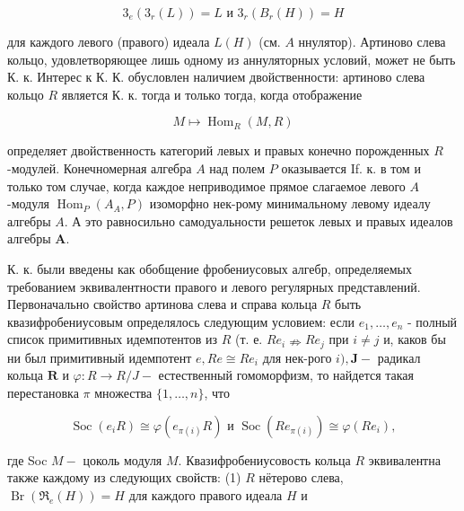 \documentclass[10pt]{article}
\begin{document}
\[

3_{e}\left(3_{r}(L)\right)=L \text { и } 3_{r}\left(B_{r}(H)\right)=H

\]



для каждого левого (правого) идеала $L(H)$ (см. $A$ ннулятор). Артиново слева кольцо, удовлетворяющее лишь одному из аннуляторных условий, может не быть К. к. Интерес к К. К. обусловлен наличием двойственности: артиново слева кольцо $R$ является К. к. тогда и только тогда, когда отображение



\[

M \longmapsto \operatorname{Hom}_{R}(M, R)

\]



определяет двойственность категорий левых и правых конечно порожденных $R$-модулей. Конечномерная алгебра $A$ над полем $P$ оказывается If. к. в том и только том случае, когда каждое неприводимое прямое слагаемое левого $A$-модуля $\operatorname{Hom}_{P}\left(A_{A}, P\right)$ изоморфно нек-рому минимальному левому идеалу алгебры $A$. А это равносильно самодуальности решеток левых и правых идеалов алгебры $\boldsymbol{A}$.



К. к. были введены как обобщение фробениусовых алгебр, определяемых требованием эквивалентности правого и левого регулярных представлений. Первоначально свойство артинова слева и справа кольца $R$ быть квазифробениусовым определялось следующим условием: если $e_{1}, \ldots, e_{n}$ - полный список примитивных идемпотентов из $R$ (т. е. $R e_{i} \nRightarrow R e_{j}$ при $i \neq j$ и, каков бы ни был примитивный идемпотент $e, R e \cong R e_{i}$ для нек-рого $i), \boldsymbol{J}-$ радикал кольца $\boldsymbol{R}$ и $\varphi: R \rightarrow R / J-$ естественный гомоморфизм, то найдется такая перестановка $\pi$ множества $\{1, \ldots, n\}$, что



\[

\operatorname{Soc}\left(e_{i} R\right) \cong \varphi\left(e_{\pi(i)} R\right) \text { и } \operatorname{Soc}\left(R e_{\pi(i)}\right) \cong \varphi\left(R e_{i}\right),

\]



где Soc $M-$ цоколь модуля $M$. Квазифробениусовость кольца $R$ эквивалентна также каждому из следующих свойств: (1) $R$ нётерово слева, $\operatorname{Br}\left(\Re_{e}(H)\right)=H$ для каждого правого идеала $H$ и
\end{document}

